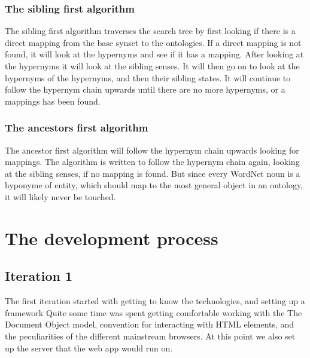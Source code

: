 \subsubsection{The sibling first algorithm}
The sibling first algorithm traverses the search tree by first looking if there is a direct mapping from the base synset to the ontologies.
If a direct mapping is not found, it will look at the hypernyms and see if it has a mapping.
After looking at the hypernyms it will look at the sibling senses.
It will then go on to look at the hypernyms of the hypernyms, and then their sibling states.
It will continue to follow the hypernym chain upwards until there are no more hypernyms, or a mappings has been found.

\subsubsection{The ancestors first algorithm}
The ancestor first algorithm will follow the hypernym chain upwards looking for mappings.
The algorithm is written to follow the hypernym chain again, looking at the sibling senses, if no mapping is found.
But since every WordNet noun is a hyponyme of {entity}, which should map to the most general object in an ontology,
it will likely never be touched.



\section{The development process}


\subsection{Iteration 1}
The first iteration started with getting to know the technologies, and setting up a framework
Quite some time was spent getting comfortable working with the 
{The Document Object model, convention for interacting with HTML elements},
and the peculiarities of the different mainstream browsers.
At this point we also set up the server that the web app would run on.

